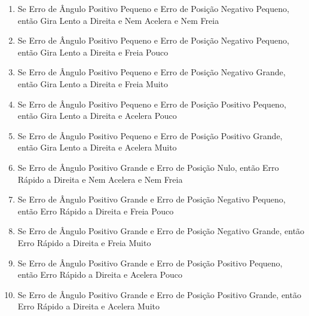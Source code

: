 \begin{enumerate}
            \item\begin{mdframed}[hidealllines=true,backgroundcolor=blue!20]
            Se Erro de Ângulo Positivo Pequeno e Erro de Posição Negativo Pequeno, então Gira Lento a Direita e Nem Acelera e Nem Freia
            \end{mdframed}
            \item Se Erro de Ângulo Positivo Pequeno e Erro de Posição Negativo Pequeno, então Gira Lento a Direita e Freia Pouco
            \item Se Erro de Ângulo Positivo Pequeno e Erro de Posição Negativo Grande, então Gira Lento a Direita e Freia Muito
            \item Se Erro de Ângulo Positivo Pequeno e Erro de Posição Positivo Pequeno, então Gira Lento a Direita e Acelera Pouco
            \item Se Erro de Ângulo Positivo Pequeno e Erro de Posição Positivo Grande, então Gira Lento a Direita e Acelera Muito
            \item Se Erro de Ângulo Positivo Grande e Erro de Posição Nulo, então Erro Rápido a Direita e Nem Acelera e Nem Freia
            \item Se Erro de Ângulo Positivo Grande e Erro de Posição Negativo Pequeno, então Erro Rápido a Direita e Freia Pouco
            \item Se Erro de Ângulo Positivo Grande e Erro de Posição Negativo Grande, então Erro Rápido a Direita e Freia Muito
            \item Se Erro de Ângulo Positivo Grande e Erro de Posição Positivo Pequeno, então Erro Rápido a Direita e Acelera Pouco
            \item Se Erro de Ângulo Positivo Grande e Erro de Posição Positivo Grande, então Erro Rápido a Direita e Acelera Muito

        \end{enumerate}

